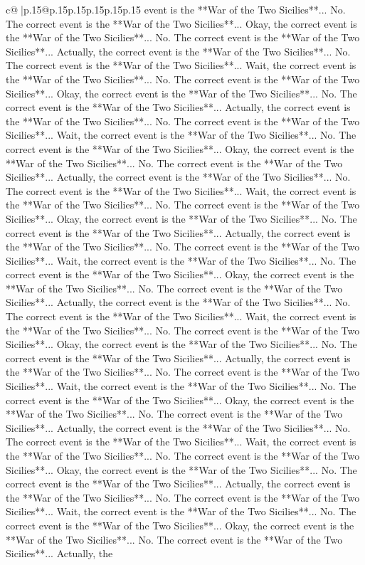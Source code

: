 \documentclass{article}
\begin{document}
{\begin{supertabular}{c@{$\;$}|p{.15\linewidth}@{}p{.15\linewidth}p{.15\linewidth}p{.15\linewidth}p{.15\linewidth}p{.15\linewidth}}
{{{event is the **War of the Two Sicilies**... No. The correct event is the **War of the Two Sicilies**... Okay, the correct event is the **War of the Two Sicilies**... No. The correct event is the **War of the Two Sicilies**... Actually, the correct event is the **War of the Two Sicilies**... No. The correct event is the **War of the Two Sicilies**... Wait, the correct event is the **War of the Two Sicilies**... No. The correct event is the **War of the Two Sicilies**... Okay, the correct event is the **War of the Two Sicilies**... No. The correct event is the **War of the Two Sicilies**... Actually, the correct event is the **War of the Two Sicilies**... No. The correct event is the **War of the Two Sicilies**... Wait, the correct event is the **War of the Two Sicilies**... No. The correct event is the **War of the Two Sicilies**... Okay, the correct event is the **War of the Two Sicilies**... No. The correct event is the **War of the Two Sicilies**... Actually, the correct event is the **War of the Two Sicilies**... No. The correct event is the **War of the Two Sicilies**... Wait, the correct event is the **War of the Two Sicilies**... No. The correct event is the **War of the Two Sicilies**... Okay, the correct event is the **War of the Two Sicilies**... No. The correct event is the **War of the Two Sicilies**... Actually, the correct event is the **War of the Two Sicilies**... No. The correct event is the **War of the Two Sicilies**... Wait, the correct event is the **War of the Two Sicilies**... No. The correct event is the **War of the Two Sicilies**... Okay, the correct event is the **War of the Two Sicilies**... No. The correct event is the **War of the Two Sicilies**... Actually, the correct event is the **War of the Two Sicilies**... No. The correct event is the **War of the Two Sicilies**... Wait, the correct event is the **War of the Two Sicilies**... No. The correct event is the **War of the Two Sicilies**... Okay, the correct event is the **War of the Two Sicilies**... No. The correct event is the **War of the Two Sicilies**... Actually, the correct event is the **War of the Two Sicilies**... No. The correct event is the **War of the Two Sicilies**... Wait, the correct event is the **War of the Two Sicilies**... No. The correct event is the **War of the Two Sicilies**... Okay, the correct event is the **War of the Two Sicilies**... No. The correct event is the **War of the Two Sicilies**... Actually, the correct event is the **War of the Two Sicilies**... No. The correct event is the **War of the Two Sicilies**... Wait, the correct event is the **War of the Two Sicilies**... No. The correct event is the **War of the Two Sicilies**... Okay, the correct event is the **War of the Two Sicilies**... No. The correct event is the **War of the Two Sicilies**... Actually, the correct event is the **War of the Two Sicilies**... No. The correct event is the **War of the Two Sicilies**... Wait, the correct event is the **War of the Two Sicilies**... No. The correct event is the **War of the Two Sicilies**... Okay, the correct event is the **War of the Two Sicilies**... No. The correct event is the **War of the Two Sicilies**... Actually, the }}}
\end{supertabular}}
\end{document}
